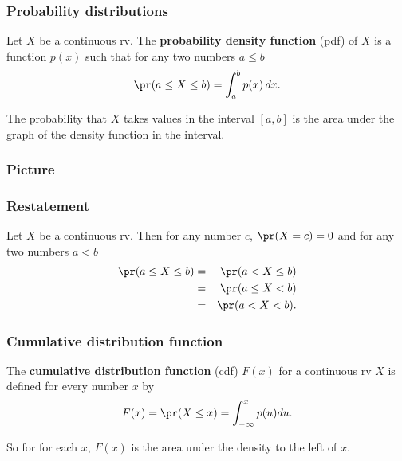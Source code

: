 \begin{frame}[fragile]\frametitle{Probability distributions}

\begin{defn}
Let $X$ be a continuous rv. The {\bf probability density function}
(pdf) of $X$ is a function $p(x)$ such that for any two numbers
$a \leq b$
$$\pr(a \leq X \leq b) = \int_a^b p(x) \, dx.$$ 

The probability that $X$ takes values in the interval $[a,b]$ 
is the area under the graph of the density function in the
interval.  
\end{defn}



\end{frame}

\begin{frame}[fragile]\frametitle{Picture}


\end{frame}



\begin{frame}[fragile]\frametitle{Restatement}

\begin{prop}
Let $X$ be a continuous rv. Then for any number $c$, $\pr(X=c) = 0$
and for any two numbers $a<b$
\begin{eqnarray*}
\pr(a \leq X \leq b) & = &\pr(a < X \leq b)  \\
 & = &\pr(a \leq X < b)  \\
& = &\pr(a < X < b).
\end{eqnarray*}
\end{prop}



\end{frame}


\begin{frame}[fragile]\frametitle{Cumulative distribution function}
\begin{defn}
The {\bf cumulative distribution function} (cdf) $F(x)$ for
a continuous rv $X$ is defined for every number $x$ by
$$F(x) = \pr(X \leq x) = \int_{-\infty}^x p(u) du.$$ 

So for for each $x$, $F(x)$ is the area under the density
to the left of $x$.
\end{defn}



\end{frame}



